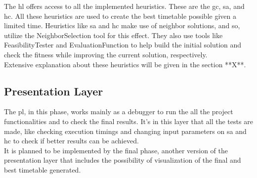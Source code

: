 The \gls{hl} offers access to all the implemented heuristics. These are the \gls{gc}, \gls{sa}, and \gls{hc}. All these heuristics are used to create the best timetable possible given a limited time. Heuristics like \gls{sa} and \gls{hc} make use of neighbor solutions, and so, utilize the NeighborSelection tool for this effect. They also use tools like FeasibilityTester and EvaluationFunction to help build the initial solution and check the fitness while improving the current solution, respectively.\\

Extensive explanation about these heuristics will be given in the {\color{red}section **X**}.

\subsection{Presentation Layer}

The \gls{pl}, in this phase, works mainly as a debugger to run the all the project functionalities and to check the final results. It's in this layer that all the tests are made, like checking execution timings and changing input parameters on \gls{sa} and \gls{hc} to check if better results can be achieved.\\

It is planned to be implemented by the final phase, another version of the presentation layer that includes the possibility of visualization of the final and best timetable generated.













